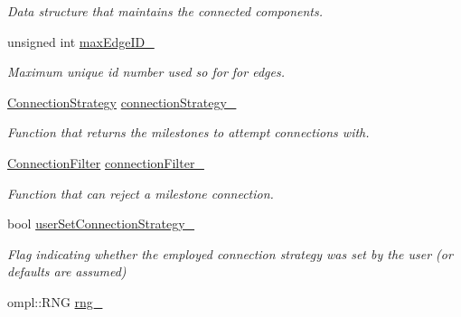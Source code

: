 \begin{DoxyCompactItemize}
\begin{DoxyCompactList}\small\item\em \-Data structure that maintains the connected components. \end{DoxyCompactList}\item 
\hypertarget{class_f_i_r_m_a517174c1ae349153df76f81f2ba2b2f1}{unsigned int \hyperlink{class_f_i_r_m_a517174c1ae349153df76f81f2ba2b2f1}{max\-Edge\-I\-D\-\_\-}}\label{class_f_i_r_m_a517174c1ae349153df76f81f2ba2b2f1}

\begin{DoxyCompactList}\small\item\em \-Maximum unique id number used so for for edges. \end{DoxyCompactList}\item 
\hypertarget{class_f_i_r_m_a0fcb0aef9c9101c4569f5b6bb5f576ae}{\hyperlink{class_f_i_r_m_a15cfbcaf52c0bdd5e6c1a969bbf7ea1e}{\-Connection\-Strategy} \hyperlink{class_f_i_r_m_a0fcb0aef9c9101c4569f5b6bb5f576ae}{connection\-Strategy\-\_\-}}\label{class_f_i_r_m_a0fcb0aef9c9101c4569f5b6bb5f576ae}

\begin{DoxyCompactList}\small\item\em \-Function that returns the milestones to attempt connections with. \end{DoxyCompactList}\item 
\hypertarget{class_f_i_r_m_a0ad7ac389f9e8b0e483826833c32da95}{\hyperlink{class_f_i_r_m_a2482eee2e5248d5bff3b3b56e5a593b3}{\-Connection\-Filter} \hyperlink{class_f_i_r_m_a0ad7ac389f9e8b0e483826833c32da95}{connection\-Filter\-\_\-}}\label{class_f_i_r_m_a0ad7ac389f9e8b0e483826833c32da95}

\begin{DoxyCompactList}\small\item\em \-Function that can reject a milestone connection. \end{DoxyCompactList}\item 
\hypertarget{class_f_i_r_m_a42cc77417338d946478f5a71e6bd5b70}{bool \hyperlink{class_f_i_r_m_a42cc77417338d946478f5a71e6bd5b70}{user\-Set\-Connection\-Strategy\-\_\-}}\label{class_f_i_r_m_a42cc77417338d946478f5a71e6bd5b70}

\begin{DoxyCompactList}\small\item\em \-Flag indicating whether the employed connection strategy was set by the user (or defaults are assumed) \end{DoxyCompactList}\item 
\hypertarget{class_f_i_r_m_a2e91a5d8aba0ccaca892fb9eeda4ef41}{ompl\-::\-R\-N\-G \hyperlink{class_f_i_r_m_a2e91a5d8aba0ccaca892fb9eeda4ef41}{rng\-\_\-}}\label{class_f_i_r_m_a2e91a5d8aba0ccaca892fb9eeda4ef41}


\end{DoxyCompactItemize}
